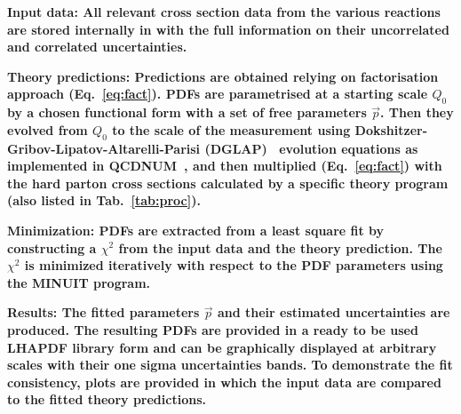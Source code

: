 \begin{description}
\item 
\bf {Input data:} \rm  All relevant cross section data from the various reactions
are stored internally in \fitter with the full information on their uncorrelated and correlated
uncertainties.
\item
\bf{Theory predictions:} \rm Predictions are obtained relying on factorisation approach (Eq.~\ref{eq:fact}). PDFs are parametrised at a starting scale $Q_0$  by a chosen functional form with a set of free parameters $\vec{p}$. Then they evolved from $Q_0$ to the scale of the measurement using 
Dokshitzer-Gribov-Lipatov-Altarelli-Parisi 
(DGLAP)~\cite{Gribov:1972ri, Gribov:1972rt, Lipatov:1974qm,
Dokshitzer:1977sg, Altarelli:1977zs} evolution equations 
as implemented in QCDNUM~\cite{qcdnum}, 
and then multiplied (Eq.~\ref{eq:fact}) with the hard parton cross sections calculated by
a specific theory program (also listed in Tab.~\ref{tab:proc}).
\item
\bf{Minimization:} \rm  PDFs are extracted from a least square fit by constructing a 
$\chi^2$ from the input data and the theory prediction.
The $\chi^2$ is  minimized iteratively 
with respect to the PDF parameters using the MINUIT\cite{minuit} program.
%
%
\item
\bf{Results:} \rm  The fitted parameters $\vec{p}$ and their estimated uncertainties are produced.
The resulting PDFs are provided in a ready to be used LHAPDF library form
and can be graphically 
displayed at arbitrary scales with their one sigma uncertainties bands.
To demonstrate the fit consistency, plots are provided 
in which the input data are compared to the fitted theory predictions.
\end{description}
%

